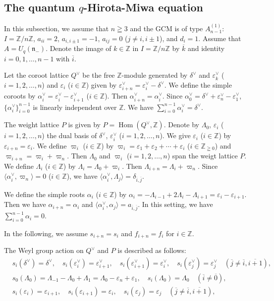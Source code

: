 \documentclass[12pt,twoside]{article}
\newcommand\bra{\langle}
\newcommand\ket{\rangle}
\newcommand\Hom{\mathop{\mathrm{Hom}}\nolimits}
\newcommand\av{\alpha^\vee}
\newcommand\eps{\varepsilon}
\newcommand\epsv{\eps^\vee}
\newcommand\deltav{\delta^\vee}
\newcommand\Qv{Q^\vee}
\newcommand\n{{\mathfrak n}}
\newcommand\Z{{\mathbb Z}} %
\theoremstyle{plain} %
\theoremstyle{definition} %
\theoremstyle{definition} %
\numberwithin{theorem}{section}
\numberwithin{equation}{section}
\numberwithin{figure}{section}
\numberwithin{table}{section}
\begin{document}

\subsection{The quantum $q$-Hirota-Miwa equation}
\label{sec:QHME}

In this subsection, we assume that
$n\geqq 3$ and the GCM is of type $A^{(1)}_{n-1}$:
$I=\Z/n\Z$, $a_{ii}=2$, $a_{i,i\pm1}=-1$, $a_{ij}=0$ ($j\ne i,i\pm1$),
and $d_i=1$.
Assume that $A=U_q(\n_-)$.
Denote the image of $k\in\Z$ in $I=\Z/n\Z$ by $\overline{k}$
and identity $i=0,1,\ldots,n-1$ with $\overline{i}$.

Let the coroot lattice $\Qv$ be the free $\Z$-module generated 
by $\deltav$ and $\epsv_k$ ($i=1,2,\ldots,n$)
and $\eps_i$ ($i\in\Z$) given by $\epsv_{i+n}=\epsv_i-\deltav$.
We define the simple coroots by $\av_i=\epsv_i-\epsv_{i+1}$ ($i\in\Z$). 
Then $\av_{i+n}=\av_i$.
Since $\av_0=\deltav+\epsv_n-\epsv_1$, 
$\{\av_i\}_{i=0}^{n-1}$ is linearly independent over $\Z$.
We have $\sum_{i=0}^{n-1}\av_i=\deltav$.

The weight lattice $P$ is given by $P=\Hom(\Qv,\Z)$.
Denote by $\Lambda_0$, $\eps_i$ ($i=1,2,\ldots,n$)
the dual basis of $\deltav$, $\epsv_i$ ($i=1,2,\dots,n$).
We give $\eps_i$ ($i\in\Z$) by $\eps_{i+n}=\eps_i$.
We define $\varpi_i$ ($i\in\Z$) by
$\varpi_i=\eps_1+\eps_2+\cdots+\eps_i$ ($i\in\Z_{\geqq0}$)
and $\varpi_{i+n}=\varpi_i+\varpi_n$.
Then $\Lambda_0$ and $\varpi_i$ ($i=1,2,\ldots,n$) span the weigt lattice $P$.
We define $\Lambda_i$ ($i\in\Z$) by
$\Lambda_i=\Lambda_0+\varpi_i$.
Then $\Lambda_{i+n}=\Lambda_i+\varpi_n$.
Since $\bra\av_i,\varpi_n\ket=0$ ($i\in\Z$), 
we have $\bra\av_i,\Lambda_j\ket=\delta_{\overline{i},\overline{j}}$.

We define the simple roots $\alpha_i$ ($i\in\Z$) by \(
 \alpha_i
 =-\Lambda_{i-1}+2\Lambda_i-\Lambda_{i+1}
 = \eps_i-\eps_{i+1}
\). Then we have $\alpha_{i+n}=\alpha_i$
and $\bra\av_i,\alpha_j\ket=a_{\overline{i},\overline{j}}$. 
In this setting, we have $\sum_{i=0}^{n-1}\alpha_i=0$.

In the following, we assume $s_{i+n}=s_i$ and $f_{i+n}=f_i$ for $i\in\Z$.

The Weyl group action on $\Qv$ and $P$ is described as follows:
\begin{align*}
 &
 s_i(\deltav)=\deltav, \quad
 s_i(\epsv_i) = \epsv_{i+1}, \quad
 s_i(\epsv_{i+1}) = \epsv_i, \quad
 s_i(\epsv_j)=\epsv_j \quad (\overline{j}\ne\overline{i},\overline{i+1}), 
 \\ &
 s_0(\Lambda_0) 
 = \Lambda_{-1}-\Lambda_0+\Lambda_1
 = \Lambda_0 - \eps_n + \eps_1,
 \quad
 s_i(\Lambda_0) = \Lambda_0 \quad (\overline{i}\ne\overline{0}), 
 \\ &
 s_i(\eps_i) = \eps_{i+1}, \quad
 s_i(\eps_{i+1}) = \eps_i, \quad
 s_i(\eps_j)=\eps_j \quad (\overline{j}\ne\overline{i},\overline{i+1}), 
\end{align*}
\end{document}
